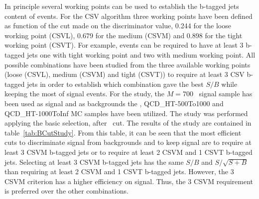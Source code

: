 In principle several working points can be used to establish the b-tagged jets content of events. For the CSV algorithm three working points have been defined as function of the cut made on the discriminator value, 0.244 for the loose working point (CSVL), 0.679 for the medium (CSVM) and 0.898 for the tight working point (CSVT). For example, events can be required to have at least 3 b-tagged jets one with tight working point and two with medium working point. All possible combinations have been studied from the three available working points (loose (CSVL), medium (CSVM) and tight (CSVT)) to require at least 3 CSV b-tagged jets in order to establish which combination gave the best $S/B$ while keeping the most of signal events. For the study, the $M=700$ \GeVcc~signal sample has been used as signal and as backgrounds the \ttbar, QCD\_HT-500To1000 and QCD\_HT-1000ToInf MC samples have been utilized. The study was performed applying the basic selection, after \HT~cut. The results of the study are contained in table~\ref{tab:BCutStudy}. From this table, it can be seen that the most efficient cuts to discriminate signal from backgrounds and to keep signal are to require at least 3 CSVM b-tagged jets or to require at least 2 CSVM and 1 CSVT b-tagged jets. Selecting at least 3 CSVM b-tagged jets has the same $S/B$ and $S/\sqrt{S+B}$ than requiring at least 2 CSVM and 1 CSVT b-tagged jets. However, the 3 CSVM criterion has a higher efficiency on signal. Thus, the 3 CSVM requirement is preferred over the other combinations. %

